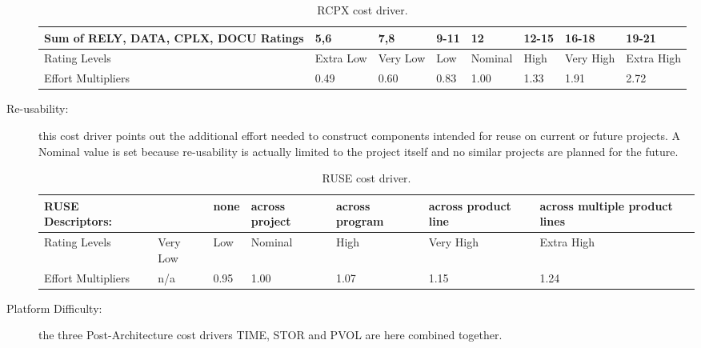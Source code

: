 \begin{description}
\begin{table}[H]
	\begin{adjustwidth}{-.5in}{-.5in}
    \centering
    \begin{tabular}{p{4cm}|p{1cm}|p{1cm}|p{1cm}|p{1.5cm}|p{1cm}|p{1cm}|p{1cm}}
        \hline
        Sum of RELY, DATA, CPLX, DOCU Ratings & 5,6 & 7,8 & 9-11 & 12 & 12-15 & 16-18 & 19-21 \\
        \hline
        \hline
        Rating Levels & Extra Low & Very Low & Low & Nominal & High & Very High & Extra High \\
        \hline
        Effort Multipliers & 0.49 & 0.60 & 0.83 & 1.00 & 1.33 & 1.91 & 2.72 \\
        \hline
    \end{tabular}
    \caption{RCPX cost driver.}
    \end{adjustwidth}
\end{table}

\item[Re-usability:] this cost driver points out the additional effort needed to construct components intended for reuse on current or future projects. A Nominal value is set because re-usability is actually limited to the project itself and no similar projects are planned for the future. 

\begin{table}[H]
	\begin{adjustwidth}{-.5in}{-.5in}
    \centering
    \begin{tabular}{p{3.8cm}|p{1cm}|p{1cm}|p{1.5cm}|p{1.6cm}|p{1.5cm}|p{2cm}}
    	\hline
        RUSE Descriptors: & & none & across project & across program & across product line & across multiple product lines \\
        \hline
        Rating Levels & Very Low & Low & Nominal & High & Very High & Extra High \\
        \hline
        Effort Multipliers & n/a & 0.95 & 1.00 & 1.07 & 1.15 & 1.24 \\
        \hline
    \end{tabular}
    \caption{RUSE cost driver.}
    \end{adjustwidth}
\end{table}

\item[Platform Difficulty:] the three Post-Architecture cost drivers TIME, STOR and PVOL are here combined together.


\end{description}
